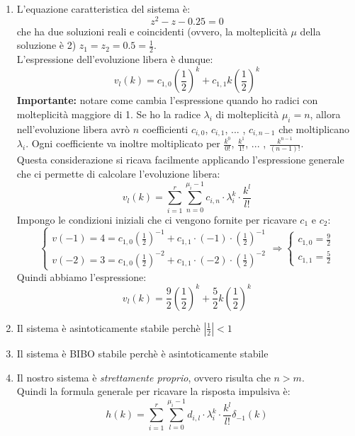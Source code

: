 \documentclass[12pt,a4paper]{article}
\begin{document}
	\begin{enumerate}
		\item L'equazione caratteristica del sistema è:\\
		\[
			z^2 - z - 0.25 = 0
		\]
		che ha due soluzioni reali e coincidenti (ovvero, la molteplicit\`a $\mu$ della soluzione \`e 2) $z_1 = z_2 = 0.5 = \frac{1}{2}$.\\
		L'espressione dell'evoluzione libera \`e dunque:
		\[
			v_l(k) = c_{1,0}\left(\frac{1}{2}\right)^k + c_{1,1}k\left(\frac{1}{2}\right)^k
		\]
		\textbf{Importante:} notare come cambia l'espressione quando ho radici con molteplicit\`a maggiore di 1. Se ho la radice $\lambda_i$ di molteplicit\`a $\mu_i = n$, allora nell'evoluzione libera avr\`o $n$ coefficienti $c_{i,0}$, $c_{i,1}$, ... , $c_{i,n-1}$ che moltiplicano $\lambda_i$. Ogni coefficiente va inoltre moltiplicato per $\frac{k^0}{0!}$, $\frac{k^1}{1!}$, ... , $\frac{k^{n-1}}{(n-1)!}$.\\
		Questa considerazione si ricava facilmente applicando l'espressione generale che ci permette di calcolare l'evoluzione libera:
		\[
			v_l(k) = \sum_{i=1}^{r}\sum_{n=0}^{\mu_i-1}c_{i,n}\cdot\lambda_i^k\cdot\frac{k^l}{l!}
		\]
		Impongo le condizioni iniziali che ci vengono fornite per ricavare $c_1$ e $c_2$:
		\[
			\begin{cases}
				v(-1) = 4 = c_{1,0}\left(\frac{1}{2}\right)^{-1} + c_{1,1}\cdot(-1)\cdot\left(\frac{1}{2}\right)^{-1}\\
				v(-2) = 3 = c_{1,0}\left(\frac{1}{2}\right)^{-2} + c_{1,1}\cdot(-2)\cdot\left(\frac{1}{2}\right)^{-2}
			\end{cases}
			\Rightarrow
			\begin{cases}
				c_{1,0} = \frac{9}{2}\\
				c_{1,1} = \frac{5}{2}
			\end{cases}
		\]
		Quindi abbiamo l'espressione:
		\[
			v_l(k) = \frac{9}{2}\left(\frac{1}{2}\right)^k + \frac{5}{2}k\left(\frac{1}{2}\right)^k
		\]
		\item Il sistema \`e asintoticamente stabile perch\`e $|\frac{1}{2}| < 1$
		\item Il sistema \`e BIBO stabile perch\`e \`e asintoticamente stabile
		\item Il nostro sistema \`e \textit{strettamente proprio}, ovvero risulta che $n > m$.\\
		Quindi la formula generale per ricavare la risposta impulsiva \`e:
		\[
			h(k) = \sum_{i=1}^{r}\sum_{l=0}^{\mu_i-1} d_{i,l}\cdot\lambda_i^k\cdot\frac{k^l}{l!}\delta_{-1}(k)
\]
\end{enumerate}
\end{document}
